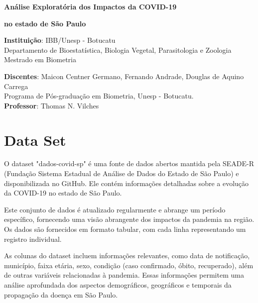 \documentclass[12pt, 
oneside,		  
a4paper,			
english,			
brazil				 
]{article}
\begin{document}
\thispagestyle{empty}

\centerline{\Large \bf Análise Exploratória dos Impactos da COVID-19}

\centerline{\Large \bf
no estado de São Paulo}
\smallskip


\begin{center}
\bigskip\bigskip\bigskip\bigskip\bigskip\bigskip
{\large{\bf Instituição}: IBB/Unesp - Botucatu}\\

{\large Departamento de Bioestatística, Biologia Vegetal, Parasitologia e Zoologia}  \\[.1cm]
{\large Mestrado em Biometria}  \\[.1cm]
\end{center}
\bigskip\bigskip\bigskip\bigskip\bigskip\bigskip

\bigskip

\begin{center}
{{\bf Discentes}: Maicon Centner Germano, Fernando Andrade, Douglas de Aquino Carrega}\\[.1cm]
Programa de Pós-graduação em Biometria, Unesp - Botucatu.\\[.1cm]

{{\bf Professor}: Thomas N. Vilches}\\[.1cm]

\end{center}

\newpage

\bigskip\bigskip\bigskip

\section{Data Set}
O dataset "dados-covid-sp" é uma fonte de dados abertos mantida pela SEADE-R (Fundação Sistema Estadual de Análise de Dados do Estado de São Paulo) e disponibilizada no GitHub. Ele contém informações detalhadas sobre a evolução da COVID-19 no estado de São Paulo.

Este conjunto de dados é atualizado regularmente e abrange um período específico, fornecendo uma visão abrangente dos impactos da pandemia na região. Os dados são fornecidos em formato tabular, com cada linha representando um registro individual.

As colunas do dataset incluem informações relevantes, como data de notificação, município, faixa etária, sexo, condição (caso confirmado, óbito, recuperado), além de outras variáveis relacionadas à pandemia. Essas informações permitem uma análise aprofundada dos aspectos demográficos, geográficos e temporais da propagação da doença em São Paulo.
\end{document}
